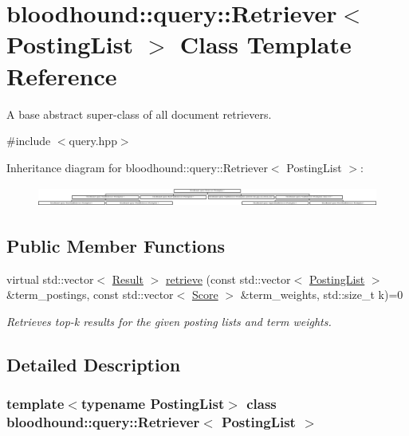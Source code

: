 \hypertarget{classbloodhound_1_1query_1_1Retriever}{}\section{bloodhound\+:\+:query\+:\+:Retriever$<$ Posting\+List $>$ Class Template Reference}
\label{classbloodhound_1_1query_1_1Retriever}


A base abstract super-\/class of all document retrievers.  




{\ttfamily \#include $<$query.\+hpp$>$}

Inheritance diagram for bloodhound\+:\+:query\+:\+:Retriever$<$ Posting\+List $>$\+:\begin{figure}[H]
\begin{center}
\leavevmode
\includegraphics[height=0.678788cm]{classbloodhound_1_1query_1_1Retriever}
\end{center}
\end{figure}
\subsection*{Public Member Functions}
\begin{DoxyCompactItemize}
\item 
virtual std\+::vector$<$ \hyperlink{structbloodhound_1_1query_1_1Result}{Result} $>$ \hyperlink{classbloodhound_1_1query_1_1Retriever_ae3c6a4628c5580e620c213b3dcd47c2b}{retrieve} (const std\+::vector$<$ \hyperlink{classbloodhound_1_1PostingList}{Posting\+List} $>$ \&term\+\_\+postings, const std\+::vector$<$ \hyperlink{structbloodhound_1_1Score}{Score} $>$ \&term\+\_\+weights, std\+::size\+\_\+t k)=0
\begin{DoxyCompactList}\small\item\em Retrieves top-\/k results for the given posting lists and term weights. \end{DoxyCompactList}\end{DoxyCompactItemize}


\subsection{Detailed Description}
\subsubsection*{template$<$typename Posting\+List$>$\newline
class bloodhound\+::query\+::\+Retriever$<$ Posting\+List $>$}

